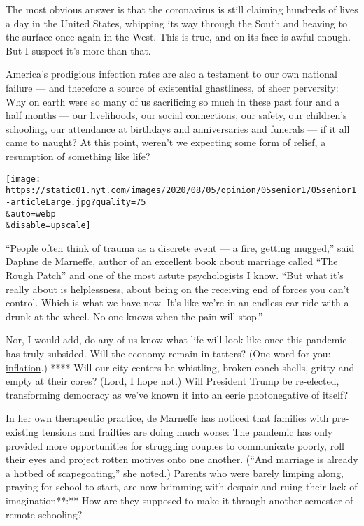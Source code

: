The most obvious answer is that the coronavirus is still claiming
hundreds of lives a day in the United States, whipping its way through
the South and heaving to the surface once again in the West. This is
true, and on its face is awful enough. But I suspect it's more than
that.

America's prodigious infection rates are also a testament to our own
national failure --- and therefore a source of existential ghastliness,
of sheer perversity: Why on earth were so many of us sacrificing so much
in these past four and a half months --- our livelihoods, our social
connections, our safety, our children's schooling, our attendance at
birthdays and anniversaries and funerals --- if it all came to naught?
At this point, weren't we expecting some form of relief, a resumption of
something like life?

\texttt{[image: https://static01.nyt.com/images/2020/08/05/opinion/05senior1/05senior1-articleLarge.jpg?quality=75\\\&auto=webp\\\&disable=upscale]}

``People often think of trauma as a discrete event --- a fire, getting
mugged,'' said Daphne de Marneffe, author of an excellent book about
marriage called
``\href{https://www.thecut.com/2018/01/daphne-de-marneff-on-the-rough-patch.html}{The
Rough Patch}'' and one of the most astute psychologists I know. ``But
what it's really about is helplessness, about being on the receiving end
of forces you can't control. Which is what we have now. It's like we're
in an endless car ride with a drunk at the wheel. No one knows when the
pain will stop.''

Nor, I would add, do any of us know what life will look like once this
pandemic has truly subsided. Will the economy remain in tatters? (One
word for you:
\href{https://www.washingtonpost.com/business/2020/08/04/grocery-prices-unemployed/?hpid=hp_hp-top-table-main_foodinflation-645pm\%3Ahomepage\%2Fstory-ans}{inflation}.)
**** Will our city centers be whistling, broken conch shells, gritty and
empty at their cores? (Lord, I hope not.) Will President Trump be
re-elected, transforming democracy as we've known it into an eerie
photonegative of itself?

In her own therapeutic practice, de Marneffe has noticed that families
with pre-existing tensions and frailties are doing much worse: The
pandemic has only provided more opportunities for struggling couples to
communicate poorly, roll their eyes and project rotten motives onto one
another. (``And marriage is already a hotbed of scapegoating,'' she
noted.) Parents who were barely limping along, praying for school to
start, are now brimming with despair and ruing their lack of
imagination**:** How are they supposed to make it through another
semester of remote schooling?

